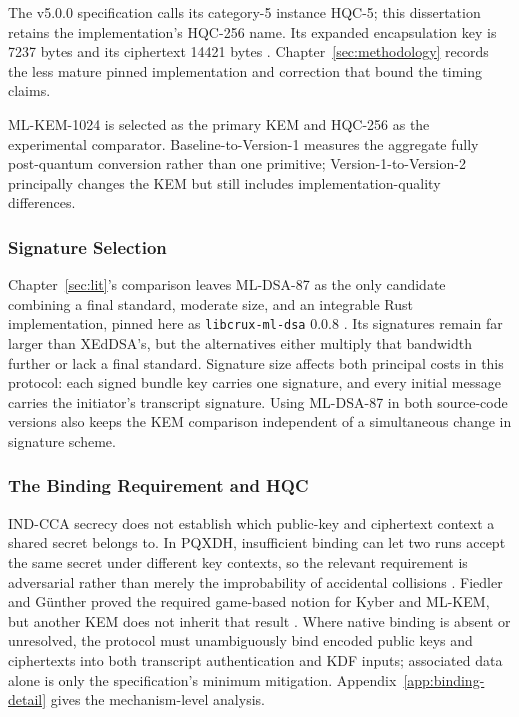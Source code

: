 The v5.0.0 specification calls its category-5 instance HQC-5; this dissertation retains the implementation's HQC-256 name. Its expanded encapsulation key is 7237 bytes and its ciphertext 14421 bytes \cite{aguilar-melchor_hqc_nodate}. Chapter~\ref{sec:methodology} records the less mature pinned implementation and correction that bound the timing claims.

ML-KEM-1024 is selected as the primary KEM and HQC-256 as the experimental comparator. Baseline-to-Version-1 measures the aggregate fully post-quantum conversion rather than one primitive; Version-1-to-Version-2 principally changes the KEM but still includes implementation-quality differences.

\subsubsection{Signature Selection}
\label{subsubsec:sig-selection}

Chapter~\ref{sec:lit}'s comparison leaves ML-DSA-87 as the only candidate combining a final standard, moderate size, and an integrable Rust implementation, pinned here as \texttt{libcrux-ml-dsa} 0.0.8 \cite{noauthor_cratesio_2026}. Its signatures remain far larger than XEdDSA's, but the alternatives either multiply that bandwidth further or lack a final standard. Signature size affects both principal costs in this protocol: each signed bundle key carries one signature, and every initial message carries the initiator's transcript signature. Using ML-DSA-87 in both source-code versions also keeps the KEM comparison independent of a simultaneous change in signature scheme.

\subsubsection{The Binding Requirement and HQC}
\label{subsubsec:binding-check}

IND-CCA secrecy does not establish which public-key and ciphertext context a shared secret belongs to. In PQXDH, insufficient binding can let two runs accept the same secret under different key contexts, so the relevant requirement is adversarial rather than merely the improbability of accidental collisions \cite{bhargavan_formal_2024}. Fiedler and G\"unther proved the required game-based notion for Kyber and ML-KEM, but another KEM does not inherit that result \cite{fiedler_security_2024}. Where native binding is absent or unresolved, the protocol must unambiguously bind encoded public keys and ciphertexts into both transcript authentication and KDF inputs; associated data alone is only the specification's minimum mitigation. Appendix~\ref{app:binding-detail} gives the mechanism-level analysis.

